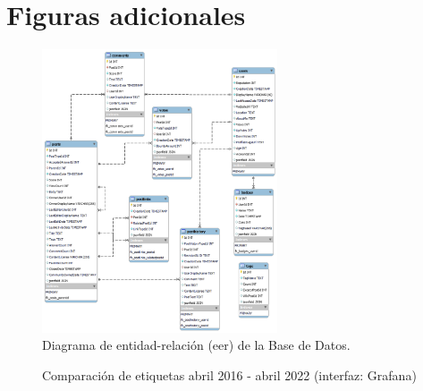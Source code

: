 \documentclass[a4paper, 12pt]{book}
\begin{document}


\appendix
\chapter{Figuras adicionales}
\label{fig:extra}
\begin{figure}
    \centering
    \includegraphics[width=0.62\textwidth, keepaspectratio]{img/modelo_entidad_relacion.png}
    \caption{Diagrama de entidad-relación (\gls{eer}) de la Base de Datos.}
    \label{fig:modelo_entidad_relacion}
\end{figure}

\newpage
\begin{figure}[ht]
    \centering
    \vspace{1.5cm}
    \caption{Comparación de etiquetas abril 2016 - abril 2022 (interfaz: Grafana)}
    \label{figura:comp_tags_tex}
\end{figure}
\end{document}
